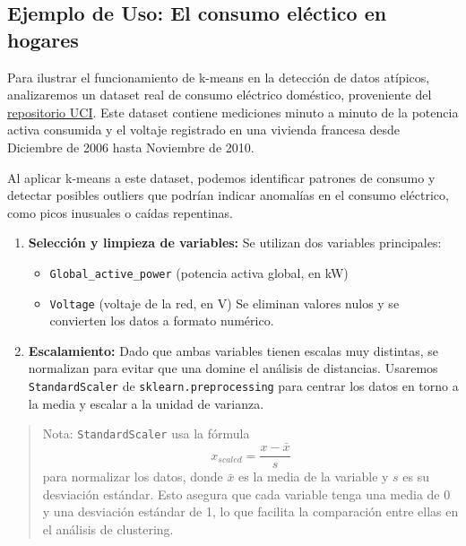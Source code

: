 \documentclass[
  spanish,
  letterpaper,
  DIV=11,
  numbers=noendperiod]{scrreprt}
\providecommand{\tightlist}{%
  \setlength{\itemsep}{0pt}\setlength{\parskip}{0pt}}
\begin{document}
\subsection{Ejemplo de Uso: El consumo eléctico en
hogares}\label{ejemplo-de-uso-el-consumo-eluxe9ctico-en-hogares}

Para ilustrar el funcionamiento de k-means en la detección de datos
atípicos, analizaremos un dataset real de consumo eléctrico doméstico,
proveniente del
\href{https://archive.ics.uci.edu/dataset/235/individual+household+electric+power+consumption}{repositorio
UCI}. Este dataset contiene mediciones minuto a minuto de la potencia
activa consumida y el voltaje registrado en una vivienda francesa desde
Diciembre de 2006 hasta Noviembre de 2010.

Al aplicar k-means a este dataset, podemos identificar patrones de
consumo y detectar posibles outliers que podrían indicar anomalías en el
consumo eléctrico, como picos inusuales o caídas repentinas.

\begin{enumerate}
\def\labelenumi{\arabic{enumi}.}
\tightlist
\item
  \textbf{Selección y limpieza de variables:} Se utilizan dos variables
  principales:

  \begin{itemize}
  \tightlist
  \item
    \texttt{Global\_active\_power} (potencia activa global, en kW)
  \item
    \texttt{Voltage} (voltaje de la red, en V) Se eliminan valores nulos
    y se convierten los datos a formato numérico.
  \end{itemize}
\item
  \textbf{Escalamiento:} Dado que ambas variables tienen escalas muy
  distintas, se normalizan para evitar que una domine el análisis de
  distancias. Usaremos \texttt{StandardScaler} de
  \texttt{sklearn.preprocessing} para centrar los datos en torno a la
  media y escalar a la unidad de varianza.
\end{enumerate}

\begin{quote}
Nota: \texttt{StandardScaler} usa la fórmula
\[x_{scaled} = \frac{x - \bar{x}}{s}\] para normalizar los datos, donde
\(\bar{x}\) es la media de la variable y \(s\) es su desviación
estándar. Esto asegura que cada variable tenga una media de 0 y una
desviación estándar de 1, lo que facilita la comparación entre ellas en
el análisis de clustering.
\end{quote}
\end{document}
